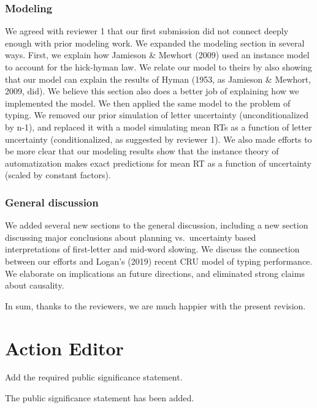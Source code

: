 \documentclass[draft]{article}
\begin{document}
\hypertarget{modeling}{%
\subsubsection{Modeling}\label{modeling}}

We agreed with reviewer 1 that our first submission did not connect deeply enough with prior modeling work. We expanded the modeling section in several ways. First, we explain how Jamieson \& Mewhort (2009) used an instance model to account for the hick-hyman law. We relate our model to theirs by also showing that our model can explain the results of Hyman (1953, as Jamieson \& Mewhort, 2009, did). We believe this section also does a better job of explaining how we implemented the model. We then applied the same model to the problem of typing. We removed our prior simulation of letter uncertainty (unconditionalized by n-1), and replaced it with a model simulating mean RTs as a function of letter uncertainty (conditionalized, as suggested by reviewer 1). We also made efforts to be more clear that our modeling results show that the instance theory of automatization makes exact predictions for mean RT as a function of uncertainty (scaled by constant factors).

\hypertarget{general-discussion}{%
\subsubsection{General discussion}\label{general-discussion}}

We added several new sections to the general discussion, including a new section discussing major conclusions about planning vs.~uncertainty based interpretations of first-letter and mid-word slowing. We discuss the connection between our efforts and Logan's (2019) recent CRU model of typing performance. We elaborate on implications an future directions, and eliminated strong claims about causality.

In sum, thanks to the reviewers, we are much happier with the present revision.

\hypertarget{action-editor}{%
\section{Action Editor}\label{action-editor}}

\RC Add the required public significance statement.

The public significance statement has been added.
\end{document}
